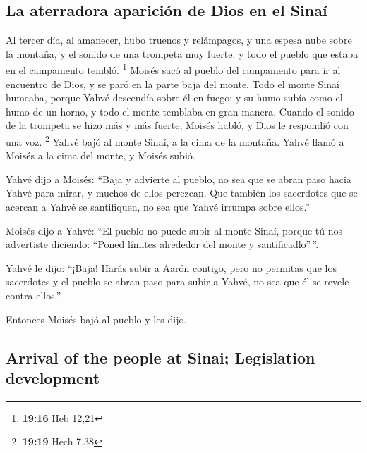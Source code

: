 \begin{paracol}{2}
\hypertarget{la-aterradora-apariciuxf3n-de-dios-en-el-sinauxed}{%
\subsection{La aterradora aparición de Dios en el
Sinaí}\label{la-aterradora-apariciuxf3n-de-dios-en-el-sinauxed}}

 Al tercer día, al amanecer, hubo truenos y relámpagos, y
una espesa nube sobre la montaña, y el sonido de una trompeta muy
fuerte; y todo el pueblo que estaba en el campamento tembló. \footnote{\textbf{19:16}
  Heb 12,21}  Moisés sacó al pueblo del campamento para
ir al encuentro de Dios, y se paró en la parte baja del monte.
 Todo el monte Sinaí humeaba, porque Yahvé descendía
sobre él en fuego; y su humo subía como el humo de un horno, y todo el
monte temblaba en gran manera.  Cuando el sonido de la
trompeta se hizo más y más fuerte, Moisés habló, y Dios le respondió con
una voz. \footnote{\textbf{19:19} Hech 7,38}  Yahvé bajó
al monte Sinaí, a la cima de la montaña. Yahvé llamó a Moisés a la cima
del monte, y Moisés subió.

 Yahvé dijo a Moisés: ``Baja y advierte al pueblo, no sea
que se abran paso hacia Yahvé para mirar, y muchos de ellos perezcan.
 Que también los sacerdotes que se acercan a Yahvé se
santifiquen, no sea que Yahvé irrumpa sobre ellos.''

 Moisés dijo a Yahvé: ``El pueblo no puede subir al monte
Sinaí, porque tú nos advertiste diciendo: ``Poned límites alrededor del
monte y santificadlo''\,''.

 Yahvé le dijo: ``¡Baja! Harás subir a Aarón contigo,
pero no permitas que los sacerdotes y el pueblo se abran paso para subir
a Yahvé, no sea que él se revele contra ellos.''

 Entonces Moisés bajó al pueblo y les dijo.

\switchcolumn
\begin{otherlanguage}{english}

\hypertarget{arrival-of-the-people-at-sinai-legislation-development}{%
\subsection{Arrival of the people at Sinai; Legislation
development}\label{arrival-of-the-people-at-sinai-legislation-development}}


\end{otherlanguage}
\end{paracol}
